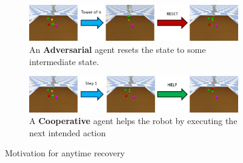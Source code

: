 \begin{figure}
    \centering
    \begin{subfigure}{\textwidth}
        \centering
        \includegraphics[width=\textwidth]{assets/anytime-1.png}
        \caption{An \textbf{Adversarial} agent resets the state to some intermediate state.}
    \end{subfigure}

    \vspace{0.5cm}

    \begin{subfigure}{\textwidth}
        \centering
        \includegraphics[width=\textwidth]{assets/anytime-2.png}
        \caption{A \textbf{Cooperative} agent helps the robot by executing the next intended action
}
    \end{subfigure}

    \caption{Motivation for anytime recovery}
    \label{fig:anytime}
\end{figure}




